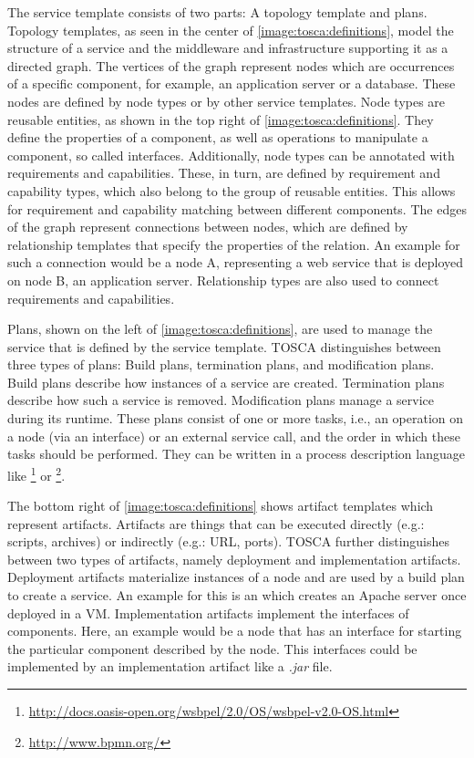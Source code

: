 The service template consists of two parts: A topology template and plans.
Topology templates, as seen in the center of \autoref{image:tosca:definitions}, model the structure of a service and the middleware and infrastructure supporting it as a directed graph.
The vertices of the graph represent nodes which are occurrences of a specific component, for example, an application server or a database.
These nodes are defined by node types or by other service templates.
Node types are reusable entities, as shown in the top right of \autoref{image:tosca:definitions}.
They define the properties of a component, as well as operations to manipulate a component, so called interfaces.
Additionally, node types can be annotated with requirements and capabilities.
These, in turn, are defined by requirement and capability types, which also belong to the group of reusable entities.
This allows for requirement and capability matching between different components.
The edges of the graph represent connections between nodes, which are defined by relationship templates that specify the properties of the relation.
An example for such a connection would be a node A, representing a web service that is deployed on node B, an application server.
Relationship types are also used to connect requirements and capabilities.

Plans, shown on the left of \autoref{image:tosca:definitions}, are used to manage the service that is defined by the service template. TOSCA distinguishes between three types of plans: Build plans, termination plans, and modification plans.
Build plans describe how instances of a service are created.
Termination plans describe how such a service is removed.
Modification plans manage a service during its runtime.
These plans consist of one or more tasks, i.e., an operation on a node (via an interface) or an external service call, and the order in which these tasks should be performed.
They can be written in a process description language like \footnote{\url{http://docs.oasis-open.org/wsbpel/2.0/OS/wsbpel-v2.0-OS.html}} or \footnote{\url{http://www.bpmn.org/}}.

The bottom right of \autoref{image:tosca:definitions} shows artifact templates which represent artifacts.
Artifacts are things that can be executed directly (e.g.: scripts, archives) or indirectly (e.g.: URL, ports).
TOSCA further distinguishes between two types of artifacts, namely deployment and implementation artifacts.
Deployment artifacts materialize instances of a node and are used by a build plan to create a service.
An example for this is an  which creates an Apache server once deployed in a VM.
Implementation artifacts implement the interfaces of components.
Here, an example would be a node that has an interface for starting the particular component described by the node.
This interfaces could be implemented by an implementation artifact like a \textit{.jar} file.

